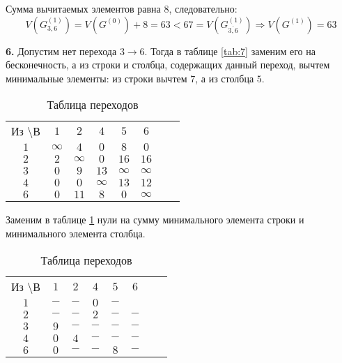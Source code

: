 Сумма вычитаемых элементов равна $8$, следовательно:
\begin{equation*}
V(G_{3,6}^{(1)}) = V(G^{(0)}) + 8 = 63 < 67 = V(G_{\overline{3,6}}^{(1)}) \Rightarrow V(G^{(1)}) = 63
\end{equation*}

\textbf{6.} Допустим нет перехода $3 \rightarrow 6$. Тогда в таблице \ref{tab:7} заменим его на бесконечность, а из строки и столбца, содержащих данный переход, вычтем минимальные элементы: из строки вычтем $7$, а из столбца $5$.

\begin{table}[H]
\begin{center}
	\def\tabcolsep{15pt}
	\caption{Таблица переходов}
	\label{tab:28}
	\begin{tabular}{|c||c|c|c|c|c|c|c|}
		\hline
		Из \textbackslash В & $1$ & $2$ & $4$ & $5$ & $6$ \\
		\hhline{|=#=|=|=|=|=|=|}
		$1$ & $\infty$ & $4$ & $0$ & $8$ & $0$ \\
		\hline
		$2$ & $2$ & $\infty$ & $0$ & $16$ & $16$ \\
		\hline
		$3$ & $0$ & $9$ & $13$ & $\infty$ & $\infty$ \\ 
		\hline
		$4$ & $0$ & $0$ & $\infty$ & $13$ & $12$ \\
		\hline
		$6$ & $0$ & $11$ & $8$ & $0$ & $\infty$ \\
		\hline
	\end{tabular}
\end{center}
\end{table}

Заменим в таблице \ref{tab:28} нули на сумму минимального элемента строки и минимального элемента столбца. 

\begin{table}[H]
\begin{center}
	\def\tabcolsep{15pt}
	\caption{Таблица переходов}
	\label{tab:111}
	\begin{tabular}{|c||c|c|c|c|c|c|c|}
		\hline
		Из \textbackslash В & $1$ & $2$ & $4$ & $5$ & $6$ \\
		\hhline{|=#=|=|=|=|=|=|}
		$1$ & $-$ & $-$ & $0$ & $-$ & \redbold{$12$} \\
		\hline
		$2$ & $-$ & $-$ & $2$ & $-$ & $-$ \\
		\hline
		$3$ & $9$ & $-$ & $-$ & $-$ & $-$ \\ 
		\hline
		$4$ & $0$ & $4$ & $-$ & $-$ & $-$ \\
		\hline
		$6$ & $0$ & $-$ & $-$ & $8$ & $-$ \\
		\hline
	\end{tabular}
\end{center}
\end{table}

